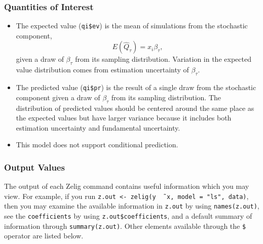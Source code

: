 \subsubsection{Quantities of Interest} 
\begin{itemize}
\item The expected value ({\tt qi\$ev}) is the mean of simulations from the stochastic
component,  
\begin{equation*}
E(\hat Q_\tau) = x_i \beta_\tau,
\end{equation*}
given a draw of $\beta_\tau$ from its sampling distribution. Variation in the expected
value distribution comes from estimation uncertainty of $\beta_\tau$.

\item The predicted value ({\tt qi\$pr}) is the result of a single draw from the
stochastic component given a draw of $\beta_\tau$ from its sampling distribution. The
distribution of predicted values should be centered around the same place as the
expected values but have larger variance because it includes both estimation
uncertainty and fundamental uncertainty.

\item This model does not support conditional prediction.
\end{itemize}

\subsubsection{Output Values}

The output of each Zelig command contains useful information which you
may view.  For example, if you run \texttt{z.out <- zelig(y \~\,
  x, model = "ls", data)}, then you may examine the available
information in \texttt{z.out} by using \texttt{names(z.out)},
see the {\tt coefficients} by using {\tt z.out\$coefficients}, and
a default summary of information through \texttt{summary(z.out)}.
Other elements available through the {\tt \$} operator are listed
below.

